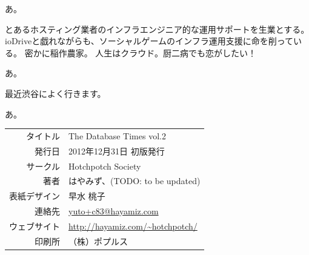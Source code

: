 \documentclass[b5paper,papersize,tombow,10pt]{jsbook}
\begin{document}
 \quad
あ。

 \quad
とあるホスティング業者のインフラエンジニア的な運用サポートを生業とする。
ioDriveと戯れながらも、ソーシャルゲームのインフラ運用支援に命を削っている。
密かに稲作農家。
人生はクラウド。厨二病でも恋がしたい！

 \quad
あ。

 \quad
最近渋谷によく行きます。

 \quad
あ。


\vspace*{15\Cvs}

\begin{center}
 \par\vspace*{1mm}
 \begin{tabular}{rl}
  \hline
  タイトル & The Database Times vol.2 \\
  発行日 & 2012年12月31日 初版発行 \\
  サークル & Hotchpotch Society \\
  著者 & はやみず、(TODO: to be updated) \\
  表紙デザイン & 早水 桃子 \\
  連絡先 & \url{yuto+c83@hayamiz.com} \\
  ウェブサイト & \url{http://hayamiz.com/~hotchpotch/} \\
  印刷所 & （株）ポプルス \\
  \hline
 \end{tabular}
\end{center}
\end{document}
